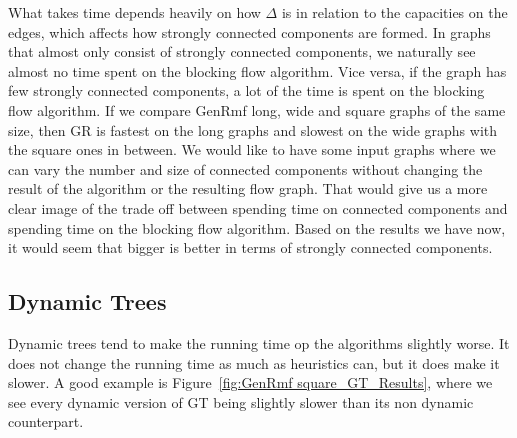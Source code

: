 What takes time depends heavily on how $\Delta$ is in relation to the capacities on the edges, which affects how strongly connected components are formed.
In graphs that almost only consist of strongly connected components, we naturally see almost no time spent on the blocking flow algorithm.
Vice versa, if the graph has few strongly connected components, a lot of the time is spent on the blocking flow algorithm.
If we compare GenRmf long, wide and square graphs of the same size, then GR is fastest on the long graphs and slowest on the wide graphs with the square ones in between.
We would like to have some input graphs where we can vary the number and size of connected components without changing the result of the algorithm or the resulting flow graph.
That would give us a more clear image of the trade off between spending time on connected components and spending time on the blocking flow algorithm.
Based on the results we have now, it would seem that bigger is better in terms of strongly connected components.


\subsection{Dynamic Trees}
\label{Dynamic Trees Section}
Dynamic trees tend to make the running time op the algorithms slightly worse. It does not change the running time as much as heuristics can, but it does make it slower.
A good example is Figure~\ref{fig:GenRmf square_GT_Results}, where we see every dynamic version of GT being slightly slower than its non dynamic counterpart.


